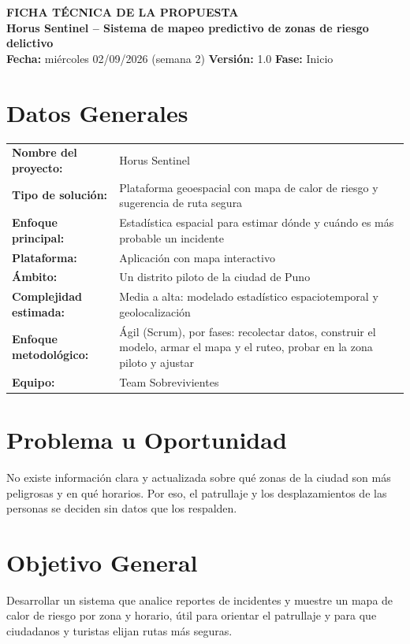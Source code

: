 \documentclass[11pt,a4paper]{article}
\begin{document}
\begin{center}
    {\Large \textbf{\textcolor{AzulUNA}{FICHA TÉCNICA DE LA PROPUESTA}}}\\[3pt]
    {\normalsize \textbf{Horus Sentinel -- Sistema de mapeo predictivo de zonas de riesgo delictivo}}\\[4pt]
    \footnotesize \textbf{Fecha:} miércoles 02/09/2026 (semana 2) \quad \textbar\quad \textbf{Versión:} 1.0 \quad \textbar\quad \textbf{Fase:} Inicio
\end{center}

\vspace{0.1cm}

\section{Datos Generales}
\noindent\begin{tabularx}{\textwidth}{@{}P{4.2cm} L@{}}
\toprule
\textbf{Nombre del proyecto:} & Horus Sentinel \\
\textbf{Tipo de solución:} & Plataforma geoespacial con mapa de calor de riesgo y sugerencia de ruta segura \\
\textbf{Enfoque principal:} & Estadística espacial para estimar dónde y cuándo es más probable un incidente \\
\textbf{Plataforma:} & Aplicación con mapa interactivo \\
\textbf{Ámbito:} & Un distrito piloto de la ciudad de Puno \\
\textbf{Complejidad estimada:} & Media a alta: modelado estadístico espaciotemporal y geolocalización \\
\textbf{Enfoque metodológico:} & Ágil (Scrum), por fases: recolectar datos, construir el modelo, armar el mapa y el ruteo, probar en la zona piloto y ajustar \\
\textbf{Equipo:} & Team Sobrevivientes \\
\bottomrule
\end{tabularx}

\section{Problema u Oportunidad}
No existe información clara y actualizada sobre qué zonas de la ciudad son más peligrosas y en qué horarios. Por eso, el patrullaje y los desplazamientos de las personas se deciden sin datos que los respalden.

\section{Objetivo General}
Desarrollar un sistema que analice reportes de incidentes y muestre un mapa de calor de riesgo por zona y horario, útil para orientar el patrullaje y para que ciudadanos y turistas elijan rutas más seguras.
\end{document}
